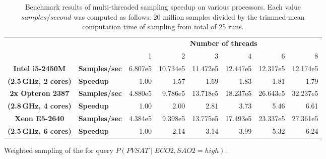 \documentclass[english,cover]{fitthesis} %
\begin{document}
\begin{table}[htb]
\begin{adjustwidth}{-0.5cm}{-0.95cm}
{    \bigskip
    \begin{subfigure}[b]{\linewidth}
        \begin{tabular}{|c|l|r|r|r|r|r|r|}
            \cline{3-8}
            \multicolumn{2}{c|}{} & \multicolumn{6}{c|}{\textbf{Number of threads}}\\
            \cline{3-8}
            \multicolumn{2}{c|}{} & 1 & 2 & 3 & 4 & 6 & 8\\ %
            \hline
            \textbf{Intel i5-2450M} & \textbf{Samples/sec}
                & 6.807e5 & 10.734e5 & 11.472e5 & 12.447e5 & 12.317e5 & 12.174e5\\
            \cline{2-8}
            \footnotesize\textbf{(2.5\,GHz, 2 cores)} & \textbf{Speedup}
                & 1.00 & 1.57 & 1.69 & 1.83 & 1.81 & 1.79\\
            \hline \hline
            \textbf{2x Opteron 2387} & \textbf{Samples/sec}
                & 4.880e5 & 9.786e5 & 13.718e5 & 18.237e5 & 26.643e5 & 32.237e5\\
            \cline{2-8}
            \footnotesize\textbf{(2.8\,GHz, 4 cores)} & \textbf{Speedup}
                & 1.00 & 2.00 & 2.81 & 3.73 & 5.46 & 6.61\\
            \hline \hline
            \textbf{Xeon E5-2640} & \textbf{Samples/sec}
                & 4.384e5 & 9.398e5 & 13.775e5 & 17.493e5 & 23.337e5 & 27.361e5\\
            \cline{2-8}
            \footnotesize\textbf{(2.5\,GHz, 6 cores)} & \textbf{Speedup}
                & 1.00 & 2.14 & 3.14 & 3.99 & 5.32 & 6.24\\
            \hline
        \end{tabular}
        \caption{Weighted sampling of the  for query $P(PVSAT \mid ECO2, SAO2 = high)$.}
    \end{subfigure}
    }
    \end{adjustwidth}
    \caption{Benchmark results of multi-threaded sampling speedup on various processors. Each value $samples/second$ was computed as follows: 20 million samples divided by the trimmed-mean computation time of sampling from total of 25 runs.
}
\end{table}
\end{document}
